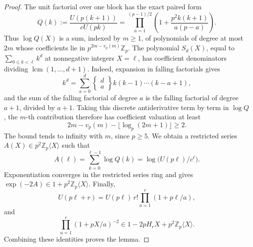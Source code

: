 \documentclass[11pt,a4paper]{article}
\theoremstyle{definition}\newtheorem{definition}[theorem]{Definition}
\theoremstyle{remark}\newtheorem{remark}[theorem]{Remark}
\numberwithin{equation}{section}
\begin{document}
\begin{proof}
The unit factorial over one block has the exact paired form
\[
 Q(k):=\frac{U(p(k+1))}{cU(pk)}
 =\prod_{a=1}^{(p-1)/2}
       \left(1+\frac{p^2k(k+1)}{a(p-a)}\right).
\]
Thus \(\log Q(X)\) is a sum, indexed by \(m\geq1\), of
polynomials of degree at most \(2m\) whose coefficients lie in
\(p^{2m-v_p(m)}\mathbb Z_p\).
The polynomial \(S_d(X)\), equal to
\(\sum_{0\leq k<\ell}k^d\) at nonnegative integers
\(X=\ell\), has coefficient denominators dividing
\(\operatorname{lcm}(1,\ldots,d+1)\).  Indeed, expansion in
falling factorials gives
\[
 k^d=\sum_{a=0}^d
 \left\{\begin{matrix}d\\a\end{matrix}\right\}
 k(k-1)\cdots(k-a+1),
\]
and the sum of the falling factorial of degree \(a\) is the
falling factorial of degree \(a+1\), divided by \(a+1\).
Taking this discrete antiderivative term by term in
\(\log Q\), the \(m\)-th contribution therefore has
coefficient valuation at least
\[
 2m-v_p(m)-\lfloor\log_p(2m+1)\rfloor\geq2.
\]
The bound tends to infinity with \(m\), since \(p\geq5\).
We obtain a restricted series
\(A(X)\in p^2\mathbb Z_p\langle X\rangle\) such that
\[
 A(\ell)=\sum_{k=0}^{\ell-1}\log Q(k)
 =\log\bigl(U(p\ell)/c^\ell\bigr).
\]
Exponentiation converges in the restricted series ring and gives
\(\exp(-2A)\in1+p^2\mathbb Z_p\langle X\rangle\).
Finally,
\[
 U(p\ell+r)=U(p\ell)\,r!
                \prod_{a=1}^r(1+p\ell/a),
\]
and
\[
 \prod_{a=1}^r(1+pX/a)^{-2}
 \in1-2pH_rX+p^2\mathbb Z_p\langle X\rangle.
\]
Combining these identities proves the lemma.
\end{proof}
\end{document}
